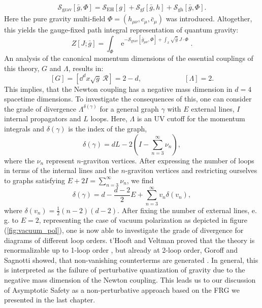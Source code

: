 \begin{align}
	\mathcal{S}_{\text{grav}}[\bar{g},\Phi] = \mathcal{S}_{\text{EH}}[g] + \mathcal{S}_{\text{gf}}[\bar{g}, h] + \mathcal{S}_{\text{gh}}[\bar{g},\Phi] .
\end{align}
 Here the pure gravity multi-field $\Phi=(h_{\mu\nu}, c_{\mu}, \bar{c}_{\mu})$ was introduced. Altogether, this yields the gauge-fixed path integral representation of quantum gravity:
 \begin{equation}
Z[J ; \bar{g}]=\int_{\Phi} \operatorname{e}^{-\mathcal{S}_{\text{grav}}\left[\bar{g}_{\mu\nu}, \Phi\right]+\int_x \sqrt{\bar{g}} \ J \cdot \Phi}.
\end{equation}
An analysis of the canonical momentum dimensions of the essential couplings of this theory, $G$ and $\Lambda$, results in:
\begin{equation}
\left[G\right] = \left[\dd^dx \sqrt{g}\ \mathcal{R}\right] = 2-d,  \qquad\qquad\qquad \left[\Lambda\right] = 2.
\end{equation}
This implies, that the Newton coupling has a negative mass dimension in $d=4$ spacetime dimensions. To investigate the consequences of this, one can consider the grade of divergence $\Lambda^{\delta(\gamma)}$ for a general graph $\gamma$ with $E$ external lines, $I$ internal propagators and $L$ loops. Here, $\Lambda$ is an UV cutoff for the momentum integrals and $\delta(\gamma)$ is the index of the graph,
\begin{equation}
	\delta(\gamma) = dL- 2\left(I-\sum_{n=3}^{\infty}\nu_n\right),
\end{equation}
where the $\nu_n$ represent $n$-graviton vertices. After expressing the number of loops in terms of the internal lines and the $n$-graviton vertices and restricting ourselves to graphs satisfying $E + 2I = \sum_{n=3}^{\infty}\nu_n$, we find
\begin{equation}
	\delta(\gamma)=d-\frac{d-2}{2} E+\sum\limits_{n=3}^{\infty} v_{n} \delta\left(v_{n}\right),
\end{equation}
where $\delta\left(v_{n}\right)=\frac{1}{2}(n-2)(d-2)$.
After fixing the number of external lines, e.\,g. to $E=2$, representing the case of vacuum polarization as depicted in figure (\ref{fig:vacuum_pol}), one is now able to investigate the grade of divergence for diagrams of different loop orders. t'Hooft and Veltman proved that the theory is renormalizable up to 1-loop order \cite{tHooftVeltmann1974}, but already at 2-loop order, Goroff and Sagnotti showed, that non-vanishing counterterms are generated \cite{GoroffSanotti1985}. In general, this is interpreted as the failure of perturbative quantization of gravity due to the negative mass dimension of the Newton coupling. This leads us to our discussion of Asymptotic Safety as a non-perturbative approach based on the FRG we presented in the last chapter.  

